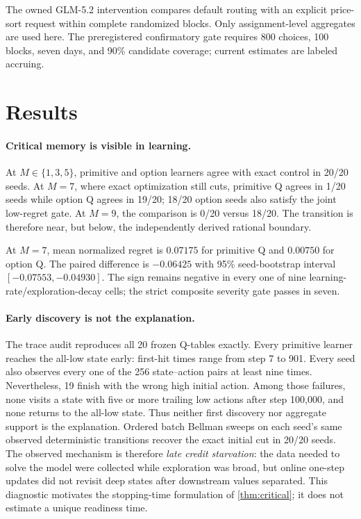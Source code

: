 \documentclass[10pt,twocolumn]{article}
\begin{document}
The owned GLM-5.2 intervention compares default routing with an explicit
price-sort request within complete randomized blocks.  Only assignment-level
aggregates are used here.  The preregistered confirmatory gate requires 800
choices, 100 blocks, seven days, and 90\% candidate coverage; current estimates
are labeled accruing.

\section{Results}

\paragraph{Critical memory is visible in learning.}
At $M\in\{1,3,5\}$, primitive and option learners agree with exact control in
20/20 seeds.  At $M=7$, where exact optimization still cuts, primitive Q agrees
in 1/20 seeds while option Q agrees in 19/20; 18/20 option seeds also satisfy
the joint low-regret gate.  At $M=9$, the comparison is 0/20 versus 18/20.
The transition is therefore near, but below, the independently derived
rational boundary.

At $M=7$, mean normalized regret is $0.07175$ for primitive Q and $0.00750$
for option Q.  The paired difference is $-0.06425$ with 95\% seed-bootstrap
interval $[-0.07553,-0.04930]$.  The sign remains negative in every one of
nine learning-rate/exploration-decay cells; the strict composite severity gate
passes in seven.

\paragraph{Early discovery is not the explanation.}
The trace audit reproduces all 20 frozen Q-tables exactly.  Every primitive
learner reaches the all-low state early: first-hit times range from step 7 to
901.  Every seed also observes every one of the 256 state--action pairs at
least nine times.  Nevertheless, 19 finish with the wrong high initial action.
Among those failures, none visits a state with five or more trailing low
actions after step 100,000, and none returns to the all-low state.  Thus neither
first discovery nor aggregate support is the explanation.  Ordered batch
Bellman sweeps on each seed's same observed deterministic transitions recover
the exact initial cut in 20/20 seeds.  The observed mechanism is therefore
\emph{late credit starvation}: the data needed to solve the model were
collected while exploration was broad, but online one-step updates did not
revisit deep states after downstream values separated.  This diagnostic
motivates the stopping-time formulation of \cref{thm:critical}; it does not
estimate a unique readiness time.
\end{document}
